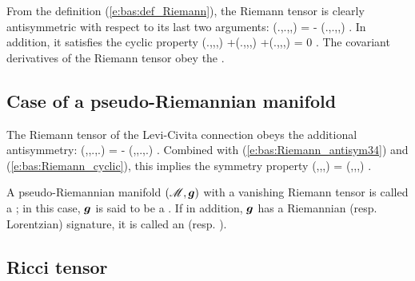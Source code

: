 From the definition (\ref{e:bas:def_Riemann}), the Riemann tensor is
clearly antisymmetric with respect to its last two arguments:
\be \label{e:bas:Riemann_antisym34}
  (.,.,,) = - (.,.,,) .
\ee
In addition, it satisfies the cyclic property
\be \label{e:bas:Riemann_cyclic}
(.,,,)
+(.,,,)
+(.,,,) = 0 .
\ee
The covariant derivatives of the Riemann tensor obey the 
\be \label{e:bas:Bianchi}
    .
\ee

\subsection{Case of a pseudo-Riemannian manifold}

The Riemann tensor of the Levi-Civita connection obeys the additional antisymmetry:
\be \label{e:bas:Riemann_antisym12}
    (\w{\omega},,.,.)
    = - (,\vw{\omega},.,.) .
\ee
Combined with (\ref{e:bas:Riemann_antisym34}) and (\ref{e:bas:Riemann_cyclic}), this implies
the symmetry property
\be \label{e:bas:Riemann_sym}
  (\w{\omega},,,) =
  (,,\vw{\omega},) .
\ee

A pseudo-Riemannian manifold $(\mathscr{M},\bm{g})$ with a vanishing Riemann tensor is called
a ; in this case, $\bm{g}$ is said to be
a . If in addition, $\bm{g}$ has a Riemannian (resp. Lorentzian) signature,
it is called an
 (resp. ).

\subsection{Ricci tensor} \label{s:bas:Ricci_tensor}


